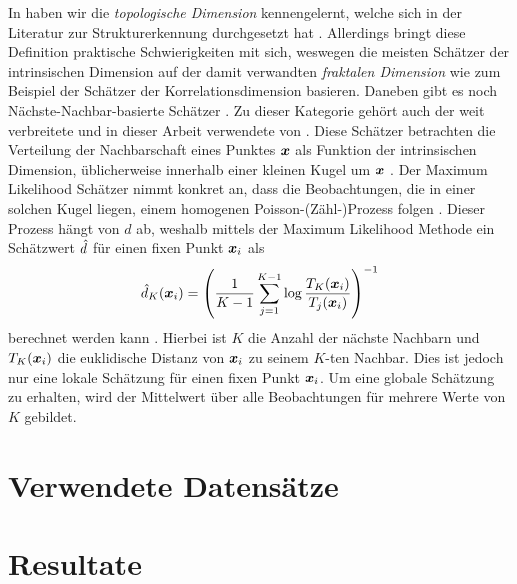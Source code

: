 In  haben wir die \textit{topologische
	Dimension} kennengelernt, welche sich in der Literatur zur Strukturerkennung durchgesetzt hat \parencite[1]{Campadelli.2015}. Allerdings bringt diese Definition praktische Schwierigkeiten mit sich,
weswegen die meisten Schätzer der intrinsischen Dimension auf der damit verwandten
\textit{fraktalen Dimension} wie zum Beispiel der Schätzer der Korrelationsdimension \parencite{Camastra.2002} basieren. Daneben gibt es noch Nächste-Nachbar-basierte Schätzer \parencite[1]{Campadelli.2015}. Zu dieser Kategorie gehört auch der weit verbreitete und in dieser
Arbeit verwendete  von \textcite{Levina.2004}. Diese Schätzer
betrachten die Verteilung der Nachbarschaft eines Punktes $\bm{x}$ als Funktion der
intrinsischen Dimension, üblicherweise innerhalb einer kleinen Kugel um $\bm{x}$
\parencite[8]{Campadelli.2015}. Der Maximum Likelihood Schätzer nimmt konkret an, dass die
Beobachtungen, die in einer solchen Kugel liegen, einem homogenen Poisson-(Zähl-)Prozess folgen
\parencite[2]{Levina.2004}. Dieser Prozess hängt von $d$ ab, weshalb mittels der Maximum Likelihood
Methode ein Schätzwert $\hat{d}$ für einen fixen Punkt $\bm{x}_i$ als
\begin{equation}
	\hat{d}_K(\bm{x}_i) = \left( \frac{1}{K - 1} \sum_{j=1}^{K - 1} \log \frac{T_K(\bm{x}_i)}{T_j(\bm{x}_i)} \right)^{-1}
\end{equation}
berechnet werden kann \parencite[4]{Levina.2004}. Hierbei ist $K$ die Anzahl der nächste Nachbarn und $T_{K}(\bm{x}_i)$ die
euklidische Distanz von $\bm{x}_i$ zu seinem $K$-ten Nachbar. Dies ist jedoch nur eine lokale
Schätzung für einen fixen Punkt $\bm{x}_i$. Um eine globale Schätzung zu erhalten, wird der
Mittelwert über alle Beobachtungen für mehrere Werte von $K$ gebildet.
\section{Verwendete Datensätze}
\label{ch:Vergleich:sec:VerwendeteDatensaetze}
\section{Resultate}
\label{ch:Vergleich:sec:Resultate}
